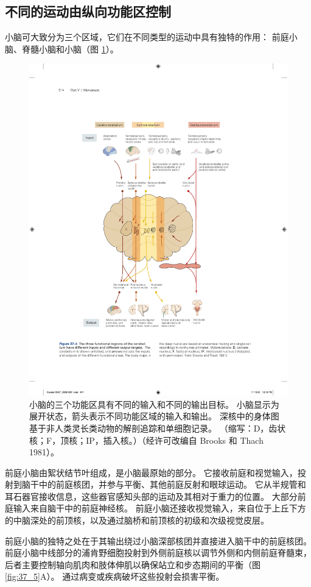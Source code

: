 \subsection{不同的运动由纵向功能区控制}

小脑可大致分为三个区域，它们在不同类型的运动中具有独特的作用：
前庭小脑、脊髓小脑和小脑（图 \ref{fig:37_4}）。

\begin{figure}[htbp]
	\centering
	\includegraphics[width=0.7\linewidth]{chap37/fig_37_4}
	\caption{小脑的三个功能区具有不同的输入和不同的输出目标。 小脑显示为展开状态，箭头表示不同功能区域的输入和输出。 深核中的身体图基于非人类灵长类动物的解剖追踪和单细胞记录。 （缩写：D，齿状核；F，顶核；IP，插入核。）（经许可改编自 Brooks 和 Thach 1981）。}
	\label{fig:37_4}
\end{figure}


前庭小脑由絮状结节叶组成，是小脑最原始的部分。
它接收前庭和视觉输入，投射到脑干中的前庭核团，并参与平衡、其他前庭反射和眼球运动。
它从半规管和耳石器官接收信息，这些器官感知头部的运动及其相对于重力的位置。
大部分前庭输入来自脑干中的前庭神经核。
前庭小脑还接收视觉输入，来自位于上丘下方的中脑深处的前顶核，以及通过脑桥和前顶核的初级和次级视觉皮层。


前庭小脑的独特之处在于其输出绕过小脑深部核团并直接进入脑干中的前庭核团。
前庭小脑中线部分的浦肯野细胞投射到外侧前庭核以调节外侧和内侧前庭脊髓束，后者主要控制轴向肌肉和肢体伸肌以确保站立和步态期间的平衡（图 \ref{fig:37_5}A）。
通过病变或疾病破坏这些投射会损害平衡。


